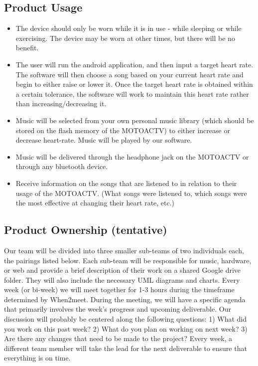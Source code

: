 \documentclass[letterpaper,english]{scrreprt}
\begin{document}
\subsection{Product Usage}
\begin{itemize}
	\item The device should only be worn while it is in use - while sleeping or while exercising. The device may be worn at other times, but there will be no benefit.
	\item The user will run the android application, and then input a target heart rate. The software will then choose a song based on your current heart rate and begin to either raise or lower it. Once the target heart rate is obtained within a certain tolerance, the software will work to maintain this heart rate rather than increasing/decreasing it.
	\item Music will be selected from your own personal music library (which should be stored on the flash memory of the MOTOACTV) to either increase or decrease heart-rate. Music will be played by our software.
	\item Music will be delivered through the headphone jack on the MOTOACTV or through any bluetooth device.
	\item Receive information on the songs that are listened to in relation to their usage of the MOTOACTV. (What songs were listened to, which songs were the most effective at changing their heart rate, etc.)
\end{itemize}

\subsection{Product Ownership (tentative)}
Our team will be divided into three smaller sub-teams of two individuals each, the pairings listed below. Each sub-team will be responsible for music, hardware, or web and provide a brief description of their work on a shared Google drive folder. They will also include the necessary UML diagrams and charts. Every week (or bi-week) we will meet together for 1-3 hours during the timeframe determined by When2meet. During the meeting, we will have a specific agenda that primarily involves the week's progress and upcoming deliverable. Our discussion will probably be centered along the following questions: 1) What did you work on this past week? 2) What do you plan on working on next week? 3) Are there any changes that need to be made to the project? Every week, a different team member will take the lead for the next deliverable to ensure that everything is on time.          	
\end{document}
